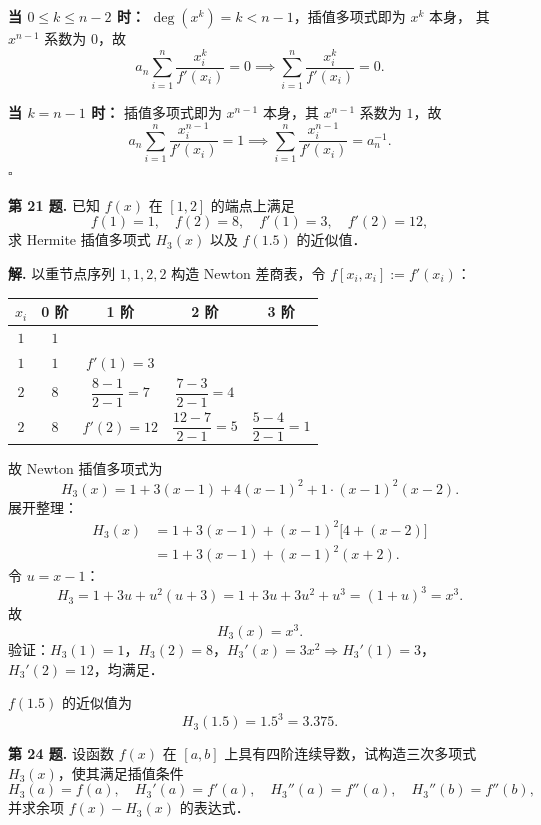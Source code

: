 \documentclass[UTF8,a4paper,11pt]{ctexart}
\newcommand*{\QED}{\hfill\ensuremath{\square}}
\begin{document}
\textbf{当 $0 \leqslant k \leqslant n-2$ 时：} $\deg(x^k) = k < n-1$，插值多项式即为 $x^k$ 本身，
其 $x^{n-1}$ 系数为 $0$，故
\[
  a_n \sum_{i=1}^{n} \frac{x_i^k}{f'(x_i)} = 0
  \implies \sum_{i=1}^{n} \frac{x_i^k}{f'(x_i)} = 0.
\]

\textbf{当 $k = n-1$ 时：} 插值多项式即为 $x^{n-1}$ 本身，其 $x^{n-1}$ 系数为 $1$，故
\[
  a_n \sum_{i=1}^{n} \frac{x_i^{n-1}}{f'(x_i)} = 1
  \implies \sum_{i=1}^{n} \frac{x_i^{n-1}}{f'(x_i)} = a_n^{-1}.
\]\QED

\bigskip\bigskip

\noindent\textbf{第 21 题.}\quad
已知 $f(x)$ 在 $[1,2]$ 的端点上满足
\[
  f(1) = 1,\quad f(2) = 8,\quad f'(1) = 3,\quad f'(2) = 12,
\]
求 Hermite 插值多项式 $H_3(x)$ 以及 $f(1.5)$ 的近似值．

\medskip
\noindent\textbf{解.}\quad
以重节点序列 $1, 1, 2, 2$ 构造 Newton 差商表，令 $f[x_i, x_i] := f'(x_i)$：

\medskip
\begin{center}
\renewcommand{\arraystretch}{1.4}
\begin{tabular}{c|cccc}
\toprule
$x_i$ & 0 阶 & 1 阶 & 2 阶 & 3 阶 \\
\midrule
$1$ & $1$ & & & \\
$1$ & $1$ & $f'(1)=3$ & & \\
$2$ & $8$ & $\dfrac{8-1}{2-1}=7$ & $\dfrac{7-3}{2-1}=4$ & \\
$2$ & $8$ & $f'(2)=12$ & $\dfrac{12-7}{2-1}=5$ & $\dfrac{5-4}{2-1}=1$ \\
\bottomrule
\end{tabular}
\end{center}

\medskip
故 Newton 插值多项式为
\[
  H_3(x)
  = 1 + 3(x-1) + 4(x-1)^2 + 1\cdot(x-1)^2(x-2).
\]
展开整理：
\begin{align*}
  H_3(x)
  &= 1 + 3(x-1) + (x-1)^2\bigl[4+(x-2)\bigr]\\
  &= 1 + 3(x-1) + (x-1)^2(x+2).
\end{align*}
令 $u = x-1$：
\[
  H_3 = 1 + 3u + u^2(u+3) = 1 + 3u + 3u^2 + u^3 = (1+u)^3 = x^3.
\]
故
\[
  \boxed{H_3(x) = x^3.}
\]
验证：$H_3(1)=1$，$H_3(2)=8$，$H_3'(x)=3x^2 \Rightarrow H_3'(1)=3$，$H_3'(2)=12$，均满足．

$f(1.5)$ 的近似值为
\[
  H_3(1.5) = 1.5^3 = 3.375.
\]

\bigskip\bigskip

\noindent\textbf{第 24 题.}\quad
设函数 $f(x)$ 在 $[a,b]$ 上具有四阶连续导数，试构造三次多项式 $H_3(x)$，使其满足插值条件
\[
  H_3(a) = f(a),\quad H_3'(a) = f'(a),\quad H_3''(a) = f''(a),\quad H_3''(b) = f''(b),
\]
并求余项 $f(x) - H_3(x)$ 的表达式．
\end{document}
